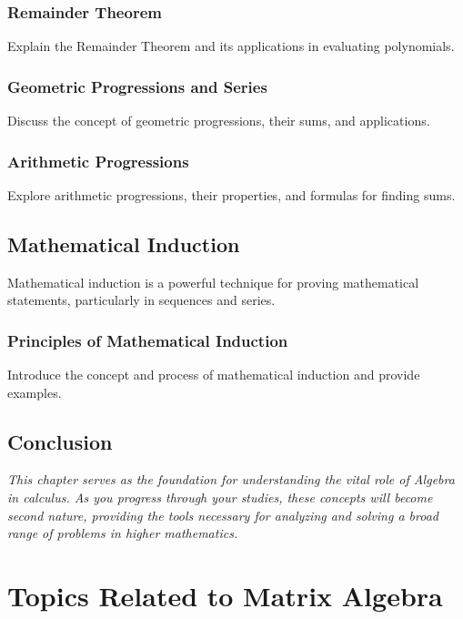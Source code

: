 \documentclass[a4paper,12pt]{book}
\newcounter{problem}
\newcounter{example}
\begin{document}
\subsection{Remainder Theorem}
\label{subsec:remainder_theorem}
Explain the Remainder Theorem and its applications in evaluating polynomials.


\subsection{Geometric Progressions and Series}
\label{subsec:geometric_progressions_series}
Discuss the concept of geometric progressions, their sums, and applications.


\subsection{Arithmetic Progressions}
\label{subsec:arithmetic_progressions}
Explore arithmetic progressions, their properties, and formulas for finding sums.


\section{Mathematical Induction}
\label{sec:mathematical_induction}
Mathematical induction is a powerful technique for proving mathematical statements, particularly in sequences and series.


\subsection{Principles of Mathematical Induction}
\label{subsec:principles_mathematical_induction}
Introduce the concept and process of mathematical induction and provide examples.


\section*{Conclusion}
\label{sec:alg_conclusion}
\textit{This chapter serves as the foundation for understanding the vital role of Algebra in calculus. As you progress through your studies, these concepts will become second nature, providing the tools necessary for analyzing and solving a broad range of problems in higher mathematics.}




\chapter{Topics Related to Matrix Algebra}
\end{document}
